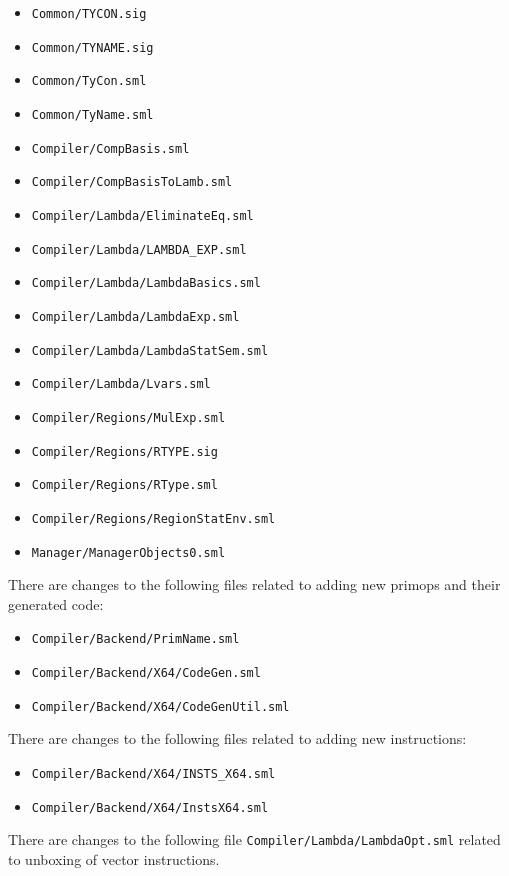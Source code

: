 \documentclass{article}
\begin{document}
\begin{itemize}
        \item \verb!Common/TYCON.sig!
        \item \verb!Common/TYNAME.sig!
        \item \verb!Common/TyCon.sml!
        \item \verb!Common/TyName.sml!
        \item \verb!Compiler/CompBasis.sml!
        \item \verb!Compiler/CompBasisToLamb.sml!
        \item \verb!Compiler/Lambda/EliminateEq.sml!
        \item \verb!Compiler/Lambda/LAMBDA_EXP.sml!
        \item \verb!Compiler/Lambda/LambdaBasics.sml!
        \item \verb!Compiler/Lambda/LambdaExp.sml!
        \item \verb!Compiler/Lambda/LambdaStatSem.sml!
        \item \verb!Compiler/Lambda/Lvars.sml!
        \item \verb!Compiler/Regions/MulExp.sml!
        \item \verb!Compiler/Regions/RTYPE.sig!
        \item \verb!Compiler/Regions/RType.sml!
        \item \verb!Compiler/Regions/RegionStatEnv.sml!
        \item \verb!Manager/ManagerObjects0.sml!
\end{itemize}

There are changes to the following files related to adding new primops and their generated code:
\begin{itemize}
        \item \verb!Compiler/Backend/PrimName.sml!
        \item \verb!Compiler/Backend/X64/CodeGen.sml!
        \item \verb!Compiler/Backend/X64/CodeGenUtil.sml!
\end{itemize}

There are changes to the following files related to adding new instructions:
\begin{itemize}
        \item \verb!Compiler/Backend/X64/INSTS_X64.sml!
        \item \verb!Compiler/Backend/X64/InstsX64.sml!
\end{itemize}

There are changes to the following file \verb!Compiler/Lambda/LambdaOpt.sml! related to unboxing of vector instructions.
\end{document}
